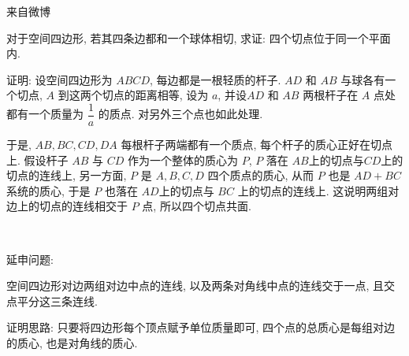 \newpage

\noindent 来自微博

对于空间四边形, 若其四条边都和一个球体相切, 求证: 四个切点位于同一个平面内.
\begin{figure*}[htbp]
\centering
{}
\end{figure*}

证明: 设空间四边形为 $ABCD$, 每边都是一根轻质的杆子. $AD$ 和 $AB$ 与球各有一个切点, $A$ 到这两个切点的距离相等, 设为 $a$, 并设$AD$ 和 $AB$ 两根杆子在 $A$ 点处都有一个质量为 $\dfrac{1}{a}$ 的质点. 对另外三个点也如此处理. 

于是, $AB, BC, CD, DA$ 每根杆子两端都有一个质点, 每个杆子的质心正好在切点上. 假设杆子 $AB$ 与 $CD$ 作为一个整体的质心为 $P$, $P$ 落在 $AB$上的切点与$CD$上的切点的连线上, 另一方面, $P$ 是 $A,B,C,D$ 四个质点的质心, 从而 $P$ 也是 $AD + BC$ 系统的质心, 于是 $P$ 也落在 $AD$上的切点与 $BC$ 上的切点的连线上. 这说明两组对边上的切点的连线相交于 $P$ 点, 所以四个切点共面.

~

\noindent 延申问题: 

空间四边形对边两组对边中点的连线, 以及两条对角线中点的连线交于一点, 且交点平分这三条连线. 

证明思路: 只要将四边形每个顶点赋予单位质量即可, 四个点的总质心是每组对边的质心, 也是对角线的质心.


\newpage






































